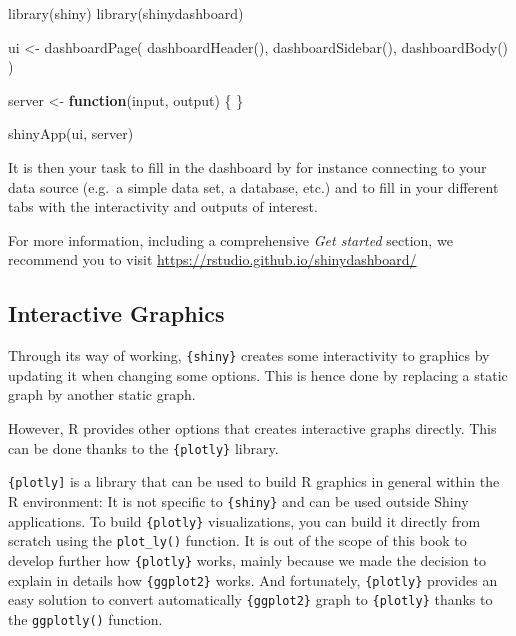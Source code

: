 \documentclass[
]{book}
\newenvironment{Shaded}{\begin{snugshade}}{\end{snugshade}}
\newcommand{\ControlFlowTok}[1]{\textcolor[rgb]{0.13,0.29,0.53}{\textbf{#1}}}
\newcommand{\FunctionTok}[1]{\textcolor[rgb]{0.00,0.00,0.00}{#1}}
\newcommand{\NormalTok}[1]{#1}
\newcommand{\OtherTok}[1]{\textcolor[rgb]{0.56,0.35,0.01}{#1}}
\begin{document}
\begin{Shaded}
\begin{Highlighting}[]
\FunctionTok{library}\NormalTok{(shiny)}
\FunctionTok{library}\NormalTok{(shinydashboard)}

\NormalTok{ui }\OtherTok{\textless{}{-}} \FunctionTok{dashboardPage}\NormalTok{(}
  \FunctionTok{dashboardHeader}\NormalTok{(),}
  \FunctionTok{dashboardSidebar}\NormalTok{(),}
  \FunctionTok{dashboardBody}\NormalTok{()}
\NormalTok{)}

\NormalTok{server }\OtherTok{\textless{}{-}} \ControlFlowTok{function}\NormalTok{(input, output) \{ \}}

\FunctionTok{shinyApp}\NormalTok{(ui, server)}
\end{Highlighting}
\end{Shaded}

It is then your task to fill in the dashboard by for instance connecting to your data source (e.g.~a simple data set, a database, etc.) and to fill in your different tabs with the interactivity and outputs of interest.

For more information, including a comprehensive \emph{Get started} section, we recommend you to visit \url{https://rstudio.github.io/shinydashboard/}

\hypertarget{interactive-graphics}{%
\subsection{Interactive Graphics}\label{interactive-graphics}}

Through its way of working, \texttt{\{shiny\}} creates some interactivity to graphics by updating it when changing some options. This is hence done by replacing a static graph by another static graph.

However, R provides other options that creates interactive graphs directly. This can be done thanks to the \texttt{\{plotly\}} library.

\texttt{\{plotly{]}} is a library that can be used to build R graphics in general within the R environment: It is not specific to \texttt{\{shiny\}} and can be used outside Shiny applications. To build \texttt{\{plotly\}} visualizations, you can build it directly from scratch using the \texttt{plot\_ly()} function. It is out of the scope of this book to develop further how \texttt{\{plotly\}} works, mainly because we made the decision to explain in details how \texttt{\{ggplot2\}} works. And fortunately, \texttt{\{plotly\}} provides an easy solution to convert automatically \texttt{\{ggplot2\}} graph to \texttt{\{plotly\}} thanks to the \texttt{ggplotly()} function.
\end{document}

